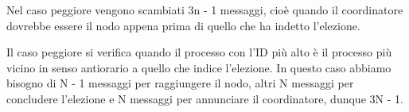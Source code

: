 Nel caso peggiore vengono scambiati 3n - 1 messaggi, cioè quando il coordinatore dovrebbe essere il nodo appena prima di quello che ha indetto l'elezione.

Il caso peggiore si verifica quando il processo con l'ID più alto è il processo più vicino in senso antiorario a quello che indice l'elezione. In questo caso abbiamo bisogno di N - 1 messaggi per raggiungere il nodo, altri N messaggi per concludere l'elezione e N messaggi per annunciare il coordinatore, dunque 3N - 1. 



























